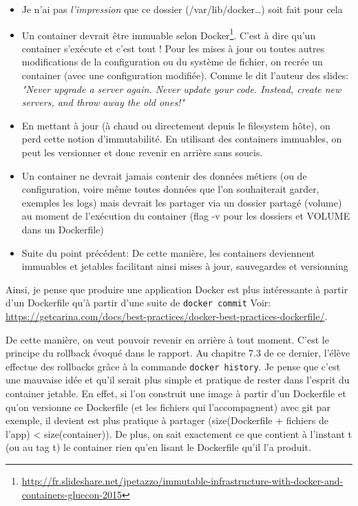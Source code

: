\documentclass[11pt,a4paper,oneside]{report}
\newcommand{\code}[1]{\texttt{#1}}
\begin{document}
	\begin{itemize}
	\item Je n'ai pas \emph{l'impression} que ce dossier (/var/lib/docker\ldots{}) soit fait pour cela

	\item Un container devrait être immuable selon Docker\footnote{\url{http://fr.slideshare.net/jpetazzo/immutable-infrastructure-with-docker-and-containers-gluecon-2015}}. C'est à dire qu'un container s'exécute et c'est tout ! Pour les mises à jour ou toutes autres modifications de la configuration ou du système de fichier, on recrée un container (avec une configuration modifiée). Comme le dit l'auteur des slides: \textit{"Never upgrade a server again. Never update your code. Instead, create new servers, and throw away the old ones!"}

	\item En mettant à jour (à chaud ou directement depuis le filesystem hôte), on perd cette notion d'immutabilité. En utilisant des containers immuables, on peut les versionner et donc revenir en arrière sans soucis.

	\item Un container ne devrait jamais contenir des données métiers (ou de configuration, voire même toutes données que l'on  souhaiterait garder, exemples les logs) mais devrait les partager via un dossier partagé (volume) au moment de l'exécution du container (flag -v pour les dossiers et VOLUME dans un Dockerfile)

	\item Suite du point précédent: De cette manière, les containers deviennent immuables et jetables facilitant ainsi mises à jour, sauvegardes et versionning
	\end{itemize}

Ainsi, je pense que produire une application Docker est plus intéressante à partir d'un Dockerfile qu'à partir d'une suite de \code{docker commit} Voir: \url{https://getcarina.com/docs/best-practices/docker-best-practices-dockerfile/}.

De cette manière, on veut pouvoir revenir en arrière à tout moment. C'est le principe du rollback évoqué dans le rapport. Au chapitre 7.3 de ce dernier, l'élève effectue des rollbacks grâce à la commande \code{docker history}. Je pense que c'est une mauvaise idée et qu'il serait plus simple et pratique de rester dans l'esprit du container jetable. En effet, si l'on construit une image à partir d'un Dockerfile et qu'on versionne ce Dockerfile (et les fichiers qui l'accompagnent) avec git par exemple, il devient est plus pratique à partager (size(Dockerfile + fichiers de l'app) \textless{} size(container)). De plus, on sait exactement ce que contient à l'instant t (ou au tag t) le container rien qu'en lisant le Dockerfile qu'il l'a produit.
\end{document}
